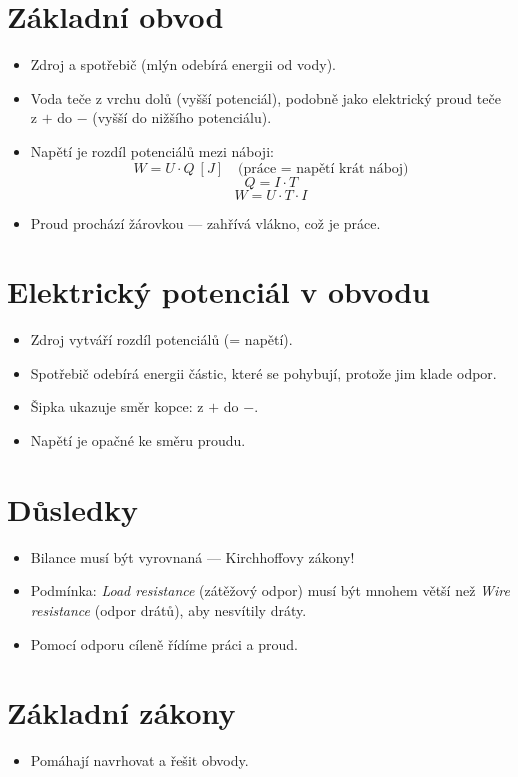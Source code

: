 \documentclass{article}
\begin{document}
\section{Základní obvod}
\begin{itemize}
    \item Zdroj a spotřebič (mlýn odebírá energii od vody).
    \item Voda teče z vrchu dolů (vyšší potenciál), podobně jako elektrický proud teče z \( + \) do \( - \) (vyšší do nižšího potenciálu).
    \item Napětí je rozdíl potenciálů mezi náboji:
    \[
    W = U \cdot Q \ [J] \quad \text{(práce = napětí krát náboj)}
    \]
    \[
    Q = I \cdot T
    \]
    \[
    W = U \cdot T \cdot I
    \]
    \item Proud prochází žárovkou — zahřívá vlákno, což je práce.
\end{itemize}

\section{Elektrický potenciál v obvodu}
\begin{itemize}
    \item Zdroj vytváří rozdíl potenciálů (= napětí).
    \item Spotřebič odebírá energii částic, které se pohybují, protože jim klade odpor.
    \item Šipka ukazuje směr kopce: z \( + \) do \( - \).
    \item Napětí je opačné ke směru proudu.
\end{itemize}

\section{Důsledky}
\begin{itemize}
    \item Bilance musí být vyrovnaná — Kirchhoffovy zákony!
    \item Podmínka: \textit{Load resistance} (zátěžový odpor) musí být mnohem větší než \textit{Wire resistance} (odpor drátů), aby nesvítily dráty.
    \item Pomocí odporu cíleně řídíme práci a proud.
\end{itemize}

\section{Základní zákony}
\begin{itemize}
    \item Pomáhají navrhovat a řešit obvody.
\end{itemize}
\end{document}
